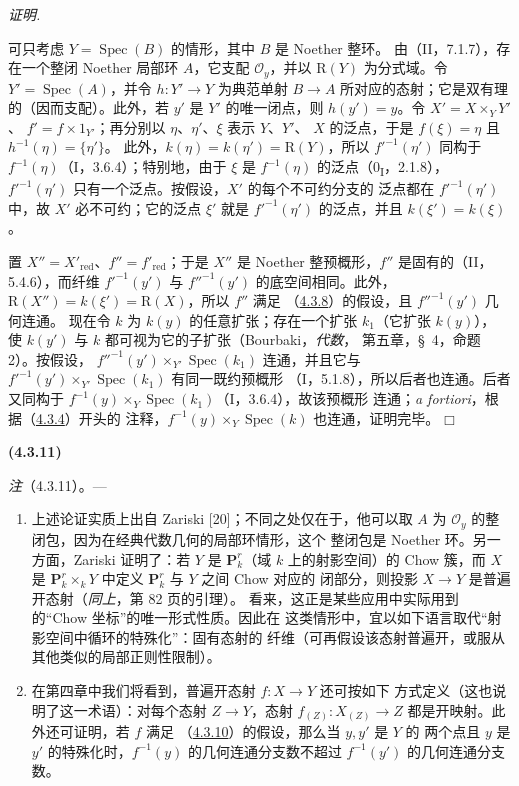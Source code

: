 \documentclass[UTF8,fontset=none,11pt,oneside,openany]{ctexbook}
\providecommand{\square}{\mdlgwhtsquare}
\newenvironment{env}[1][]{%
  \par\medskip\noindent\textbf{(#1)}\ %
}{\par}
\newenvironment{proof}{%
  \par\smallskip\noindent\textit{证明.}\ %
}{\hfill$\square$\par}
\newcommand{\oldpage}[2][]{%
  \hypertarget{ega-source-page-#1-#2}{}%
  \marginnote{\scriptsize\textbf{#1}~|~#2}\ignorespaces}
\let\EGAOriginalLabel\label
\renewcommand{\label}[1]{\phantomsection\EGAOriginalLabel{#1}}
\begin{document}
\begin{proof}
可只考虑 $Y=\operatorname{Spec}(B)$ 的情形，其中 $B$ 是 Noether 整环。
由（II，7.1.7），存在一个整闭 Noether 局部环 $A$，它支配
$\mathcal O_y$，并以 $\mathrm R(Y)$ 为分式域。令
$Y'=\operatorname{Spec}(A)$，并令 $h:Y'\to Y$ 为典范单射
$B\to A$ 所对应的态射；它是双有理的（因而支配）。此外，若 $y'$
是 $Y'$ 的唯一闭点，则 $h(y')=y$。令 $X'=X\times_YY'$、
$f'=f\times1_{Y'}$；再分别以 $\eta$、$\eta'$、$\xi$ 表示 $Y$、$Y'$、
$X$ 的泛点，于是 $f(\xi)=\eta$ 且 $h^{-1}(\eta)=\{\eta'\}$。
此外，$k(\eta)=k(\eta')=\mathrm R(Y)$，所以 $f'^{-1}(\eta')$ 同构于
$f^{-1}(\eta)$（I，3.6.4）；特别地，由于 $\xi$ 是
$f^{-1}(\eta)$ 的泛点（0\textsubscript{I}，2.1.8），
$f'^{-1}(\eta')$ 只有一个泛点。按假设，$X'$ 的每个不可约分支的
泛点都在 $f'^{-1}(\eta')$ 中，故 $X'$ 必不可约；它的泛点 $\xi'$
就是 $f'^{-1}(\eta')$ 的泛点，并且 $k(\xi')=k(\xi)$。

\oldpage[III]{134}

置 $X''=X'_{\mathrm{red}}$、$f''=f'_{\mathrm{red}}$；于是 $X''$ 是
Noether 整预概形，$f''$ 是固有的（II，5.4.6），而纤维
$f'^{-1}(y')$ 与 $f''^{-1}(y')$ 的底空间相同。此外，
$\mathrm R(X'')=k(\xi')=\mathrm R(X)$，所以 $f''$ 满足
（\hyperref[III.4.3.8-fr]{4.3.8}）的假设，且 $f''^{-1}(y')$ 几何连通。
现在令 $k$ 为 $k(y)$ 的任意扩张；存在一个扩张 $k_1$（它扩张 $k(y)$），
使 $k(y')$ 与 $k$ 都可视为它的子扩张（Bourbaki，\emph{代数}，
第五章，\S~4，命题 2）。按假设，
$f''^{-1}(y')\times_{Y'}\operatorname{Spec}(k_1)$ 连通，并且它与
$f'^{-1}(y')\times_{Y'}\operatorname{Spec}(k_1)$ 有同一既约预概形
（I，5.1.8），所以后者也连通。后者又同构于
$f^{-1}(y)\times_Y\operatorname{Spec}(k_1)$（I，3.6.4），故该预概形
连通；\emph{a fortiori}，根据（\hyperref[III.4.3.4-fr]{4.3.4}）开头的
注释，$f^{-1}(y)\times_Y\operatorname{Spec}(k)$ 也连通，证明完毕。
\end{proof}

\begin{env}[4.3.11]
\label{III.4.3.11-fr}
\emph{注}（4.3.11）。---
\begin{enumerate}
\item[(i)] 上述论证实质上出自 Zariski [20]；不同之处仅在于，他可以取
$A$ 为 $\mathcal O_y$ 的整闭包，因为在经典代数几何的局部环情形，这个
整闭包是 Noether 环。另一方面，Zariski 证明了：若 $Y$ 是
$\mathbf P_k^r$（域 $k$ 上的射影空间）的 Chow 簇，而 $X$ 是
$\mathbf P_k^r\times_kY$ 中定义 $\mathbf P_k^r$ 与 $Y$ 之间 Chow 对应的
闭部分，则投影 $X\to Y$ 是普遍开态射（\emph{同上}，第 82 页的引理）。
看来，这正是某些应用中实际用到的“Chow 坐标”的唯一形式性质。因此在
这类情形中，宜以如下语言取代“射影空间中循环的特殊化”：固有态射的
纤维（可再假设该态射普遍开，或服从其他类似的局部正则性限制）。

\item[(ii)] 在第四章中我们将看到，普遍开态射 $f:X\to Y$ 还可按如下
方式定义（这也说明了这一术语）：对每个态射 $Z\to Y$，态射
$f_{(Z)}:X_{(Z)}\to Z$ 都是开映射。此外还可证明，若 $f$ 满足
（\hyperref[III.4.3.10-fr]{4.3.10}）的假设，那么当 $y,y'$ 是 $Y$ 的
两个点且 $y$ 是 $y'$ 的特殊化时，$f^{-1}(y)$ 的几何连通分支数不超过
$f^{-1}(y')$ 的几何连通分支数。
\end{enumerate}
\end{env}
\end{document}

